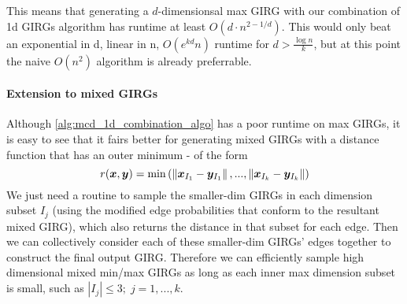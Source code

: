 
This means that generating a $d$-dimensionsal max GIRG with our combination of 1d GIRGs algorithm has runtime at least $O(d \cdot n^{2 - 1/d})$. This would only beat an exponential in d, linear in n, $O(e^{kd} n)$ runtime for $d > \frac{\log n}{k}$, but at this point the naive $O(n^2)$ algorithm is already preferrable.



\paragraph{Extension to mixed GIRGs}
Although \cref{alg:mcd_1d_combination_algo} has a poor runtime on max GIRGs, it is easy to see that it fairs better for generating mixed GIRGs with a distance function that has an outer minimum - of the form 
\begin{equation}
    r(\bm{x}, \bm{y}) = \min \left ( \left\lVert \bm{x}_{I_1} - \bm{y}_{I_1}\right\rVert, ..., \left\lVert \bm{x}_{I_k} - \bm{y}_{I_k}\right\rVert  \right )
\end{equation}
We just need a routine to sample the smaller-dim GIRGs in each dimension subset $I_j$ (using the modified edge probabilities that conform to the resultant mixed GIRG), which also returns the distance in that subset for each edge. Then we can collectively consider each of these smaller-dim GIRGs' edges together to construct the final output GIRG.
Therefore we can efficiently sample high dimensional mixed min/max GIRGs as long as each inner max dimension subset is small, such as $|I_j| \leq 3;\; j=1,...,k$.




